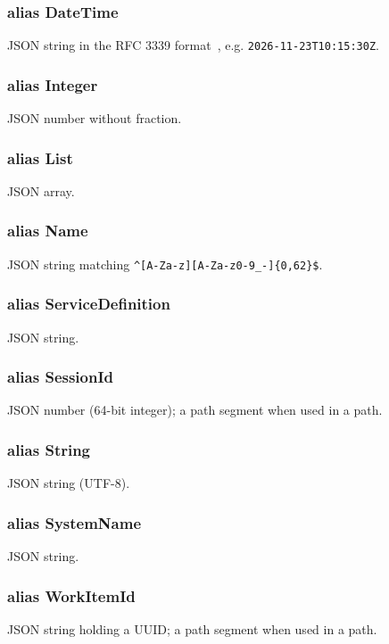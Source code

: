 \documentclass[a4paper]{arrowhead}
\newcommand{\pdef}[1]{{\textcolor{ArrowheadGrey}{#1\label{sec:model:primitives:#1}\label{sec:model:primitives:#1s}}}}
\begin{document}
\subsubsection*{alias \pdef{DateTime}}
JSON string in the RFC 3339 format~\cite{rfc3339}, e.g. \texttt{2026-\allowbreak{}11-\allowbreak{}23T10:15:30Z}.

\subsubsection*{alias \pdef{Integer}}
JSON number without fraction.

\subsubsection*{alias \pdef{List}}
JSON array.

\subsubsection*{alias \pdef{Name}}
JSON string matching \texttt{\^{}[A-Za-z][A-Za-z0-9\_-]\{0,62\}\$}.

\subsubsection*{alias \pdef{ServiceDefinition}}
JSON string.

\subsubsection*{alias \pdef{SessionId}}
JSON number (64-bit integer); a path segment when used in a path.

\subsubsection*{alias \pdef{String}}
JSON string (UTF-8).

\subsubsection*{alias \pdef{SystemName}}
JSON string.

\subsubsection*{alias \pdef{WorkItemId}}
JSON string holding a UUID; a path segment when used in a path.
\end{document}
